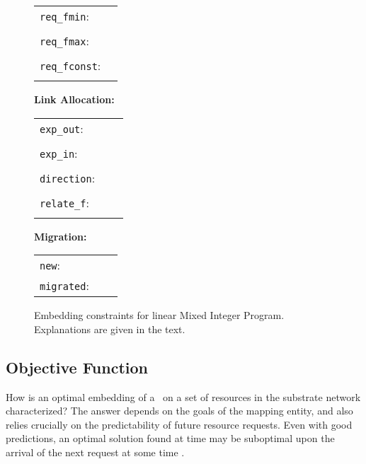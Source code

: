 \documentclass[conference,10pt]{IEEEtran}
\newcommand{\CloudNet}{\text{CloudNet}}
\begin{document}
\begin{figure*} [tb!]
\begin{scriptsize}
\vspace*{1mm}
\begin{tabular}{ll}
  \texttt{req\_fmin}: &  \\
  &  \\
  \texttt{req\_fmax}: &   \\
  &  \\
\texttt{req\_fconst}: &  
  \\ & \\
\end{tabular}

\vspace*{1mm}

\noindent \textbf{\normalsize Link Allocation:}

\vspace{1mm}

\begin{tabular}{lll}
  \texttt{exp\_out}: &  & \\
	& &  \\
\texttt{exp\_in}: &  & \\
	& &  \\   \texttt{direction}: &  & \\
	& &  \\
  \texttt{relate\_f}: &  & \\
	& &  \\
\end{tabular}

\vspace*{1mm}

\noindent \textbf{\normalsize Migration:}

\vspace*{1mm}

\begin{tabular}{l l l}
  \texttt{new}: &  &  \\
  \texttt{migrated}: &  & 
\end{tabular}
\end{scriptsize}
\begin{center}
\caption{Embedding constraints for linear Mixed Integer Program.
Explanations are given in the text.}\label{fig:constraints}
\end{center}
\end{figure*}


\subsection{Objective Function}\label{ssec:mip:prog:objective}

How is an optimal embedding of a \CloudNet\ on a
set of resources in the substrate network characterized?
The answer depends on the goals of the mapping entity, and also
relies crucially on the predictability of future resource requests.
Even with good predictions, an optimal solution found at time 
may be suboptimal upon the arrival of the next request at some time
.
\end{document}
